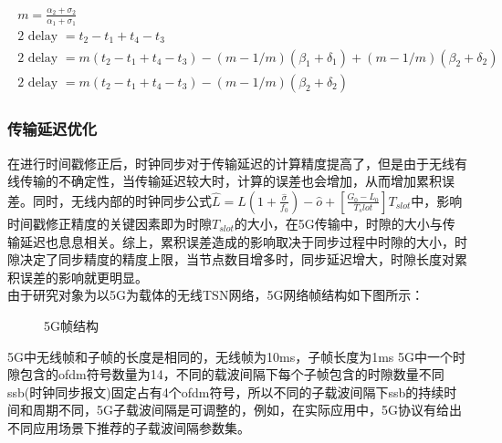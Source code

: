 \documentclass[UTF8,a4paper,12pt]{ctexart}
\numberwithin{equation}{section}
\begin{document}
\begin{eqnarray}
	\begin{gathered}
		m=\frac{\alpha_{2}+\sigma_{2}}{\alpha_{1}+\sigma_{1}}\\
		2 \text { delay }=t_{2}-t_{1}+t_{4}-t_{3} \\
		2 \text { delay }=m\left(t_{2}-t_{1}+t_{4}-t_{3}\right)-(m-1 / m)\left(\beta_{1}+\delta_{1}\right)+(m-1 / m)\left(\beta_{2}+\delta_{2}\right) \\
		2 \text { delay }=m\left(t_{2}-t_{1}+t_{4}-t_{3}\right)-(m-1 / m)\left(\beta_{2}+\delta_{2}\right)
	\end{gathered}
\end{eqnarray}
\subsubsection{传输延迟优化}
在进行时间戳修正后，时钟同步对于传输延迟的计算精度提高了，但是由于无线有线传输的不确定性，当传输延迟较大时，计算的误差也会增加，从而增加累积误差。同时，无线内部的时钟同步公式$\widehat{L}=L(1+\frac{\widehat{\sigma}}{f_0})-\widehat{o}+[\frac{G_0-L_0}{T_slot}]T_{slot}$中，影响时间戳修正精度的关键因素即为时隙$T_{slot}$的大小，在5G传输中，时隙的大小与传输延迟也息息相关。综上，累积误差造成的影响取决于同步过程中时隙的大小，时隙决定了同步精度的精度上限，当节点数目增多时，同步延迟增大，时隙长度对累积误差的影响就更明显。\\
由于研究对象为以5G为载体的无线TSN网络，5G网络帧结构如下图所示：
\begin{figure}[htb]
	\caption{\label{1} 5G帧结构}
\end{figure}
5G中无线帧和子帧的长度是相同的，无线帧为10ms，子帧长度为1ms
5G中一个时隙包含的ofdm符号数量为14，不同的载波间隔下每个子帧包含的时隙数量不同
ssb(时钟同步报文)固定占有4个ofdm符号，所以不同的子载波间隔下ssb的持续时间和周期不同，5G子载波间隔是可调整的，例如，在实际应用中，5G协议有给出不同应用场景下推荐的子载波间隔参数集。
\end{document}
